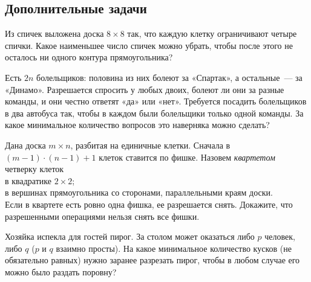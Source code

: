 

\subsection*{Дополнительные задачи}



\begin{problems}

\item
Из спичек выложена доска $8 \times 8$ так, что каждую клетку ограничивают
четыре спички.
Какое наименьшее число спичек можно убрать, чтобы после этого не осталось
ни одного контура прямоугольника?

\item
Есть $2 n$ болельщиков: половина из них болеют за «Спартак», а остальные~—
за «Динамо».
Разрешается спросить у любых двоих, болеют ли они за разные команды, и они
честно ответят «да» или «нет».
Требуется посадить болельщиков в два автобуса так, чтобы в каждом были
болельщики только одной команды.
За какое минимальное количество вопросов это наверняка можно сделать?

\item
Дана доска $m \times n$, разбитая на единичные клетки.
Сначала в $(m - 1) \cdot (n - 1) + 1$ клеток ставится по фишке.
Назовем \emph{квартетом} четверку клеток
\\
\subproblem в квадратике $2 \times 2$;
\\
\subproblem в вершинах прямоугольника со сторонами, параллельными краям доски.
\\
Если в квартете есть ровно одна фишка, ее разрешается снять.
Докажите, что разрешенными операциями нельзя снять все фишки.

\item
Хозяйка испекла для гостей пирог.
За столом может оказаться либо $p$ человек, либо $q$
($p$ и $q$ взаимно просты).
На какое минимальное количество кусков (не обязательно равных) нужно заранее
разрезать пирог, чтобы в любом случае его можно было раздать поровну?

\end{problems}

